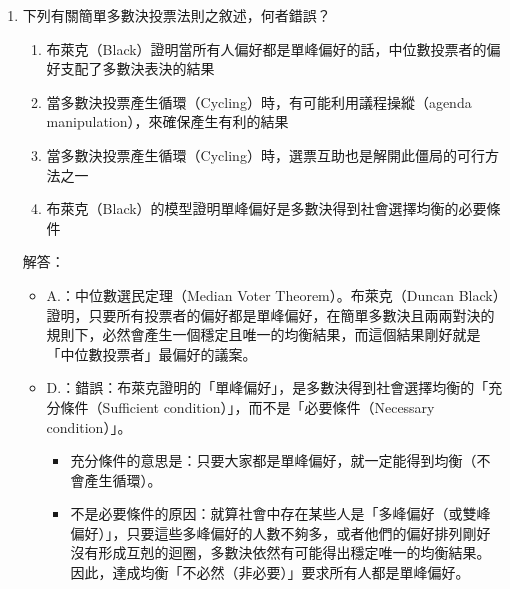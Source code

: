 \documentclass[12pt, a4paper]{article}
\begin{document}
\begin{enumerate}
    \item 下列有關簡單多數決投票法則之敘述，何者錯誤？
    \begin{enumerate}[label=\Alph*.]
        \item 布萊克（Black）證明當所有人偏好都是單峰偏好的話，中位數投票者的偏好支配了多數決表決的結果
        \item 當多數決投票產生循環（Cycling）時，有可能利用議程操縱（agenda manipulation），來確保產生有利的結果
        \item 當多數決投票產生循環（Cycling）時，選票互助也是解開此僵局的可行方法之一
        \item 布萊克（Black）的模型證明單峰偏好是多數決得到社會選擇均衡的必要條件
    \end{enumerate}
    解答：
    \begin{itemize}
        \item A.：中位數選民定理（Median Voter Theorem）。布萊克（Duncan Black）證明，只要所有投票者的偏好都是單峰偏好，在簡單多數決且兩兩對決的規則下，必然會產生一個穩定且唯一的均衡結果，而這個結果剛好就是「中位數投票者」最偏好的議案。
        \item D.：錯誤：布萊克證明的「單峰偏好」，是多數決得到社會選擇均衡的「充分條件（Sufficient condition）」，而不是「必要條件（Necessary condition）」。
        \begin{itemize}
            \item 充分條件的意思是：只要大家都是單峰偏好，就一定能得到均衡（不會產生循環）。
            \item 不是必要條件的原因：就算社會中存在某些人是「多峰偏好（或雙峰偏好）」，只要這些多峰偏好的人數不夠多，或者他們的偏好排列剛好沒有形成互剋的迴圈，多數決依然有可能得出穩定唯一的均衡結果。因此，達成均衡「不必然（非必要）」要求所有人都是單峰偏好。
        \end{itemize}
    \end{itemize}


\end{enumerate}
\end{document}
